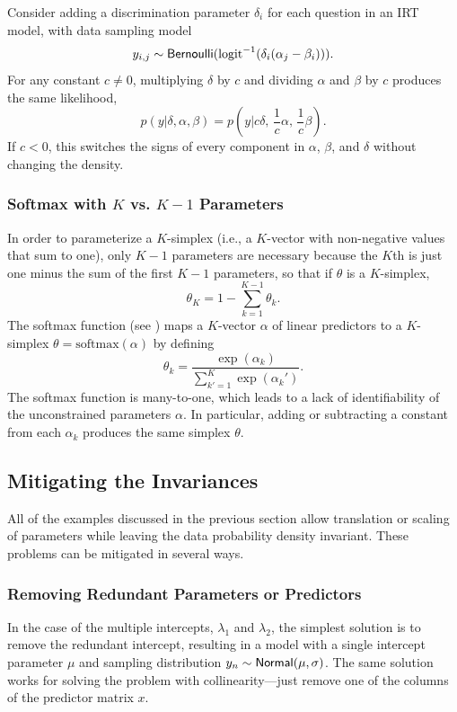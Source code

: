 Consider adding a discrimination parameter $\delta_i$ for each
question in an IRT model, with data sampling model
\[
y_{i, j} \sim \mbox{\sf Bernoulli}(\mbox{logit}^{-1}(\delta_i(\alpha_j - \beta_i))).
\]
For any constant $c \neq 0$, multiplying $\delta$ by $c$ and dividing
$\alpha$ and $\beta$ by $c$ produces the same likelihood,
\[
p(y|\delta,\alpha,\beta)
= p(y|c \delta, \, \frac{1}{c}\alpha, \, \frac{1}{c}\beta).
\]
If $c < 0$, this switches the signs of every component in $\alpha$,
$\beta$, and $\delta$ without changing the density.


\subsubsection{Softmax with $K$ vs. $K-1$ Parameters}

In order to parameterize a $K$-simplex (i.e., a $K$-vector with
non-negative values that sum to one), only $K - 1$ parameters are
necessary because the $K$th is just one minus the sum of the first $K
- 1$ parameters, so that if $\theta$ is a $K$-simplex,
%
\[
\theta_K = 1 - \sum_{k=1}^{K-1} \theta_k.
\]
%
The softmax function (see ) maps a $K$-vector
$\alpha$ of linear predictors to a $K$-simplex $\theta =
\mbox{softmax}(\alpha)$ by defining
%
\[
\theta_k = \frac{\exp(\alpha_k)}{\sum_{k'=1}^K \exp(\alpha_k')}.
\]
%
The softmax function is many-to-one, which leads to a lack of
identifiability of the unconstrained parameters $\alpha$.  In
particular, adding or subtracting a constant from each $\alpha_k$
produces the same simplex $\theta$.



\subsection{Mitigating the Invariances}

All of the examples discussed in the previous section allow
translation or scaling of parameters while leaving the data
probability density invariant.  These problems can be mitigated in
several ways.

\subsubsection{Removing Redundant Parameters or Predictors}

In the case of the multiple intercepts, $\lambda_1$ and $\lambda_2$,
the simplest solution is to remove the redundant intercept, resulting
in a model with a single intercept parameter $\mu$ and sampling
distribution $y_n \sim \mbox{\sf Normal}(\mu, \sigma)$.  The same
solution works for solving the problem with collinearity---just remove
one of the columns of the predictor matrix $x$.


